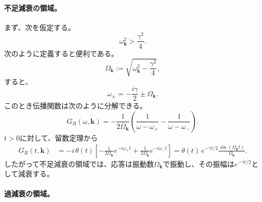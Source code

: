 \documentclass[a4paper,11pt,oneside]{article}
\theoremstyle{definition}
\numberwithin{equation}{section}
\begin{document}
\paragraph{不足減衰の領域。}



まず、次を仮定する。
\begin{equation}
\omega_{\mathbf k}^2>\frac{\gamma^2}{4}.
\end{equation}
次のように定義すると便利である。
\begin{equation}
\Omega_{\mathbf k}
:=
\sqrt{
\omega_{\mathbf k}^2-\frac{\gamma^2}{4}
},
\end{equation}
すると、
\begin{equation}
\omega_\pm
=
-\frac{i\gamma}{2}
\pm
\Omega_{\mathbf k}.
\end{equation}
このとき伝播関数は次のように分解できる。
\begin{equation}
G_R(\omega,\mathbf k)
=
-\frac{1}{2\Omega_{\mathbf k}}
\left(
\frac{1}{\omega-\omega_+}
-
\frac{1}{\omega-\omega_-}
\right).
\end{equation}
$t>0$に対して、留数定理から
\begin{align}
G_R(t,\mathbf k)
&=
-i\,\theta(t)
\left[
-\frac{1}{2\Omega_{\mathbf k}}e^{-i\omega_+t}
+
\frac{1}{2\Omega_{\mathbf k}}e^{-i\omega_-t}
\right]=
\theta(t)\,
e^{-\gamma t/2}
\frac{\sin(\Omega_{\mathbf k}t)}{\Omega_{\mathbf k}}.
\end{align}
したがって不足減衰の領域では、応答は振動数$\Omega_{\mathbf k}$で振動し、その振幅は$e^{-\gamma t/2}$として減衰する。



\paragraph{過減衰の領域。}
\end{document}
